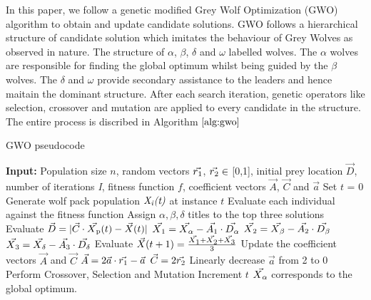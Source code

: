 \documentclass[conference]{IEEEtran}
\begin{document}
In this paper, we follow a genetic modified Grey Wolf Optimization (GWO) algorithm \cite{gwo} to obtain and update candidate solutions. GWO follows a hierarchical structure of candidate solution which imitates the behaviour of Grey Wolves as observed in nature. The structure of $\alpha$, $\beta$, $\delta$ and $\omega$ labelled wolves. The $\alpha$ wolves are responsible for finding the global optimum whilst being guided by the $\beta$ wolves. The $\delta$ and $\omega$ provide secondary assistance to the leaders and hence maitain the dominant structure. After each search iteration, genetic operators like selection, crossover and mutation are applied to every candidate in the structure. The entire process is discribed in Algorithm $\ref{alg:gwo}$

\begin{algorithm}[t]
\footnotesize
\caption{GWO pseudocode}
\label{alg:gwo}
\begin{algorithmic}[1]
\STATE \textbf{Input:} Population size $\textit{n}$, random vectors $\vec{r\textsubscript{1}}$, $\vec{r\textsubscript{2}} \in$ [0,1], initial prey location $\vec{D}$, number of iterations \textit{I}, fitness function $\textit{f}$, coefficient vectors $\vec{A}$, $\vec{C}$ and $\vec{a}$
\STATE Set $\textit{t}$ = 0
\STATE Generate wolf pack population $\textit{X\textsubscript{i}(t)}$ at instance $\textit{t}$
\STATE Evaluate each individual against the fitness function
\ENDFOR
\STATE Assign $\alpha, \beta, \delta$ titles to the top three solutions
\STATE Evaluate $\vec{D} = |\vec{C} \cdot \vec{X\textsubscript{p}}(t) - \vec{X}(t)|$
\STATE $\vec{X\textsubscript{1}} = \vec{X\textsubscript{$\alpha$}} - \vec{A\textsubscript{1}} \cdot  \vec{D\textsubscript{$\alpha$}}$
\STATE $\vec{X\textsubscript{2}} = \vec{X\textsubscript{$\beta$}} - \vec{A\textsubscript{2}} \cdot  \vec{D\textsubscript{$\beta$}}$
\STATE $\vec{X\textsubscript{3}} = \vec{X\textsubscript{$\delta$}} - \vec{A\textsubscript{3}} \cdot  \vec{D\textsubscript{$\delta$}}$
\STATE Evaluate $\vec{X}(t+1) = \frac{\vec{X\textsubscript{1}} + \vec{X\textsubscript{2}} + \vec{X\textsubscript{3}}}{3}$
\ENDFOR
\STATE Update the coefficient vectors $\vec{A}$ and $\vec{C}$
\STATE $\vec{A} = 2\vec{a} \cdot \vec{r\textsubscript{1}} - \vec{a}$
\STATE $\vec{C} = 2\vec{r\textsubscript{2}}$
\STATE Linearly decrease $\vec{a}$ from 2 to 0
\STATE Perform Crossover, Selection and Mutation
\STATE Increment $\textit{t}$
\ENDFOR
\STATE $\vec{X\textsubscript{$\alpha$}}$ corresponds to the global optimum. 
\end{algorithmic}
\end{algorithm}
\end{document}
